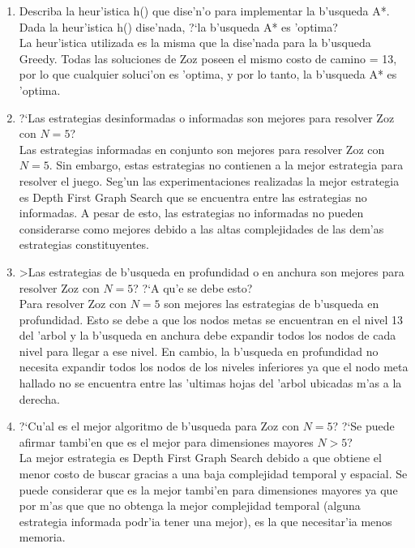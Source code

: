 \documentclass[11pt]{article}
\begin{document}
\begin{enumerate}
\begin{enumerate}
	\item Describa la heur'istica h() que dise'n'o para implementar la b'usqueda A*. Dada la heur'istica h() dise'nada, ?`la b'usqueda A* es 'optima? \\
	
	La heur'istica utilizada es la misma que la dise'nada para la b'usqueda Greedy. Todas las soluciones de Zoz poseen el mismo costo de camino = 13, por lo que cualquier soluci'on es 'optima, y por lo tanto, la b'usqueda A* es 'optima. \\ 	
	
	\item ?`Las estrategias desinformadas o informadas son mejores para resolver Zoz con $N=5$? \\
	 	
	Las estrategias informadas en conjunto son mejores para resolver Zoz con $N=5$. Sin embargo, estas estrategias no contienen a la mejor estrategia para resolver el juego. Seg'un las experimentaciones realizadas la mejor estrategia es Depth First Graph Search que se encuentra entre las estrategias no informadas. A pesar de esto, las estrategias no informadas no pueden considerarse como mejores debido a las altas complejidades de las dem'as estrategias constituyentes. \\
	
	\item >Las estrategias de b'usqueda en profundidad o en anchura son mejores para resolver Zoz con $N=5$? ?`A qu'e se debe esto? \\
	
	Para resolver Zoz con $N=5$ son mejores las estrategias de b'usqueda en profundidad. Esto se debe a que los nodos metas se encuentran en el nivel 13 del 'arbol y la b'usqueda en anchura debe expandir todos los nodos de cada nivel para llegar a ese nivel. En cambio, la b'usqueda en profundidad no necesita expandir todos los nodos de los niveles inferiores ya que el nodo meta hallado no se encuentra entre las 'ultimas hojas del 'arbol ubicadas m'as a la derecha. \\ 
	
	\item ?`Cu'al es el mejor algoritmo de b'usqueda para Zoz con $N=5$? ?`Se puede afirmar tambi'en que es el mejor para dimensiones mayores $N>5$? \\
	
	La mejor estrategia es Depth First Graph Search debido a que obtiene el menor costo de buscar gracias a una baja complejidad temporal y espacial. Se puede considerar que es la mejor tambi'en para dimensiones mayores ya que por m'as que que no obtenga la mejor complejidad temporal (alguna estrategia informada podr'ia tener una mejor), es la que necesitar'ia menos memoria. \\
	

\end{enumerate}
\end{enumerate}
\end{document}
